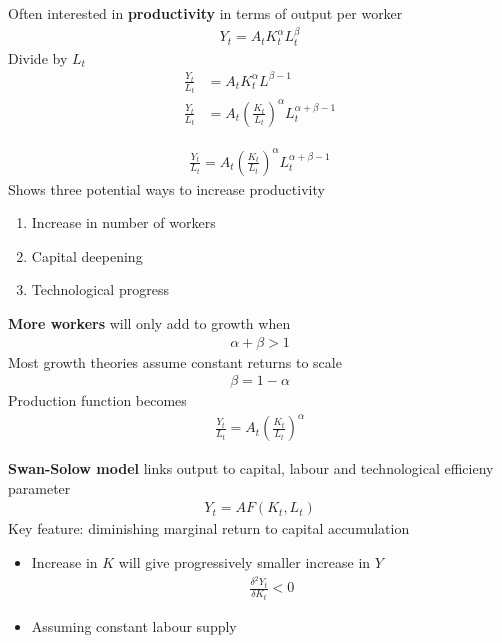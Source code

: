 \documentclass{beamer}
\begin{document}
\begin{frame}
 Often interested in \textbf{productivity} in terms of output per worker
 \begin{align}
  Y_t=A_tK^{\alpha}_tL^{\beta}_t
\end{align}
\medskip
Divide by $L_t$
 \begin{align}
  \frac{Y_t}{L_t} &=A_t K_t^{\alpha}L^{\beta-1}\\ \nonumber 
  \frac{Y_t}{L_t} &= A_t \left(\frac{K_t}{L_t} \right)^{\alpha}L_t^{\alpha + \beta -1}
 \end{align} 
\end{frame}


\begin{frame}
\begin{align*}
  \frac{Y_t}{L_t}= A_t \left(\frac{K_t}{L_t} \right)^{\alpha}L_t^{\alpha + \beta -1}
 \end{align*} 
Shows three potential ways to increase productivity
 \begin{enumerate}
   \item Increase in number of workers
   \item Capital deepening
   \item Technological progress
 \end{enumerate}
\end{frame}


\begin{frame}
  \textbf{More workers} will only add to growth when
  \begin{align}
    \alpha+\beta>1
  \end{align}
  \medskip
  Most growth theories assume constant returns to scale
  \begin{align}
    \beta=1-\alpha
  \end{align}
  Production function becomes
  \begin{align}
    \frac{Y_t}{L_t}= A_t \left(\frac{K_t}{L_t} \right)^{\alpha}
  \end{align}
\end{frame}

\begin{frame}
  \textbf{Swan-Solow model} links output to capital, labour and technological efficieny parameter
  \begin{align}
    Y_t = AF(K_t,L_t) 
  \end{align}
   \medskip
  Key feature: diminishing marginal return to capital accumulation
  \begin{itemize}
    \item Increase in $K$ will give progressively smaller increase in $Y$
    \begin{align*}
       \frac{\delta^2Y_t}{\delta K_t}<0    
    \end{align*}
    \item Assuming constant labour supply
  \end{itemize}
\end{frame}
\end{document}
